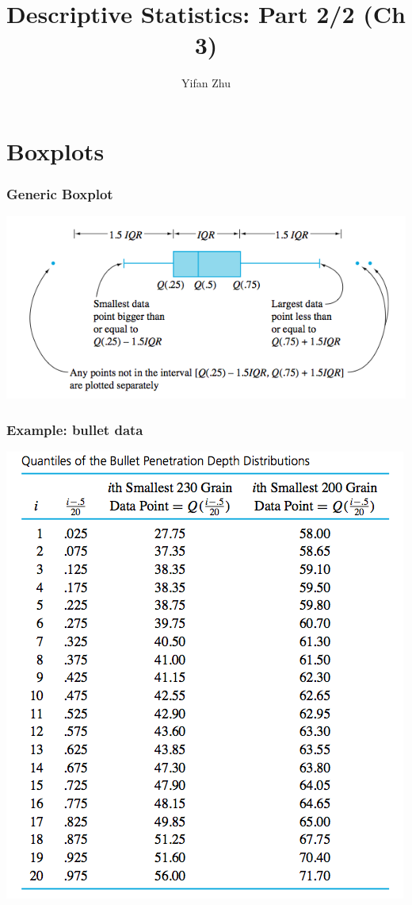 \documentclass{beamer}
\title{Descriptive Statistics: Part 2/2 (Ch 3)}
\author{Yifan Zhu}
\date{}
\institute{Iowa State University}
\numberwithin{equation}{section}
\begin{document}


\begin{frame}
\titlepage
 \end{frame}
 


\section{Boxplots}

\begin{frame}
\frametitle{Generic Boxplot}
\begin{center}
 \includegraphics{../../fig/genericbox.png}
\end{center}
\end{frame}

\begin{frame}
\frametitle{Example: bullet data}
\begin{center}
 \includegraphics{../../fig/bulletquantiles.png}
\end{center}
\end{frame}
\end{document}
